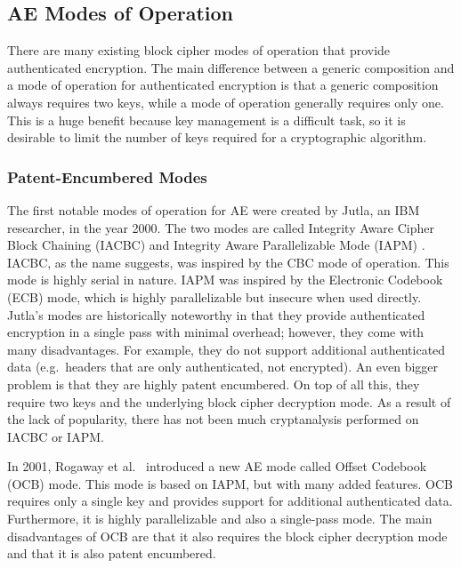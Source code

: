 \subsection{AE Modes of Operation}
There are many existing block cipher modes of operation that provide authenticated encryption.
The main difference between a generic composition and a mode of operation for authenticated encryption is that a generic composition always requires two keys, while a mode of operation generally requires only one.
This is a huge benefit because key management is a difficult task, so it is desirable to limit the number of keys required for a cryptographic algorithm.

\subsubsection{Patent-Encumbered Modes}
The first notable modes of operation for AE were created by Jutla, an IBM researcher, in the year 2000.
The two modes are called Integrity Aware Cipher Block Chaining (IACBC) and Integrity Aware Parallelizable Mode (IAPM) \cite{Jutla2001_AE}.
IACBC, as the name suggests, was inspired by the CBC mode of operation.
This mode is highly serial in nature.
IAPM was inspired by the Electronic Codebook (ECB) mode, which is highly parallelizable but insecure when used directly.
Jutla's modes are historically noteworthy in that they provide authenticated encryption in a single pass with minimal overhead; however, they come with many disadvantages.
For example, they do not support additional authenticated data (e.g.\ headers that are only authenticated, not encrypted).
An even bigger problem is that they are highly patent encumbered.
On top of all this, they require two keys and the underlying block cipher decryption mode.
As a result of the lack of popularity, there has not been much cryptanalysis performed on IACBC or IAPM.

In 2001, Rogaway et al.\ \cite{Rogaway2003_OCB} introduced a new AE mode called Offset Codebook (OCB) mode.
This mode is based on IAPM, but with many added features.
OCB requires only a single key and provides support for additional authenticated data.
Furthermore, it is highly parallelizable and also a single-pass mode.
The main disadvantages of OCB are that it also requires the block cipher decryption mode and that it is also patent encumbered. 

